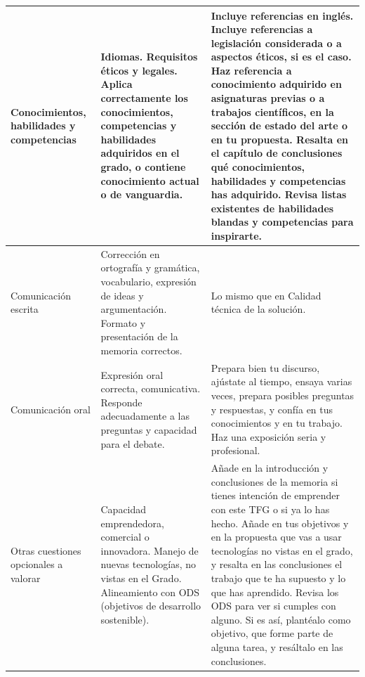 \begin{table}
{\begin{tabular}{|p{3cm} |p{5cm}| p{15cm}|}
Conocimientos, habilidades y competencias &	Idiomas. Requisitos éticos y legales. Aplica correctamente los conocimientos, competencias y habilidades adquiridos en el grado, o contiene conocimiento actual o de vanguardia. & Incluye referencias en inglés. Incluye referencias a legislación considerada o a aspectos éticos, si es el caso. Haz referencia a conocimiento adquirido en asignaturas previas o a trabajos científicos, en la sección de estado del arte o en tu propuesta. Resalta en el capítulo de conclusiones qué conocimientos, habilidades y competencias has adquirido. Revisa listas existentes de habilidades blandas y competencias para inspirarte.  \\ \hline

Comunicación escrita &	Corrección en ortografía y gramática, vocabulario, expresión de ideas y argumentación. Formato y presentación de la memoria correctos. &  Lo mismo que en Calidad técnica de la solución. \\ \hline

Comunicación oral &	Expresión oral correcta, comunicativa. Responde adecuadamente a las preguntas y capacidad para el debate. & Prepara bien tu discurso, ajústate al tiempo, ensaya varias veces, prepara posibles preguntas y respuestas, y confía en tus conocimientos y en tu trabajo. Haz una exposición seria y profesional. \\ \hline

Otras cuestiones opcionales a valorar & Capacidad emprendedora, comercial o innovadora. Manejo de nuevas tecnologías, no vistas en el Grado. Alineamiento con ODS (objetivos de desarrollo sostenible). & Añade en la introducción y conclusiones de la memoria si tienes intención de emprender con este TFG o si ya lo has hecho. Añade en tus objetivos y en la propuesta que vas a usar tecnologías no vistas en el grado, y resalta  en las conclusiones el trabajo que te ha supuesto y lo que has aprendido. Revisa los ODS para ver si cumples con alguno. Si es así, plantéalo como objetivo, que forme parte de alguna tarea, y resáltalo en las conclusiones. \\  \hline
\end{tabular}
}
    
    \label{tab:recomendaciones}
\end{table}


